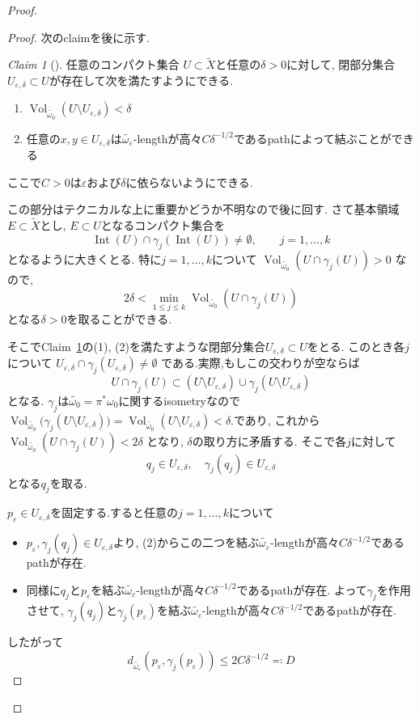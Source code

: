 \documentclass[dvipdfmx,a4paper,11pt]{article} %
\theoremstyle{definition}
\theoremstyle{remark}
\newtheorem{claim}[thm]{Claim}
\numberwithin{equation}{section}
\DeclareMathOperator{\Vol}{Vol}
\begin{document}
\begin{proof}
\begin{proof}
次のclaimを後に示す.  
\begin{claim}[{\cite[Lemma 1.3]{DPS96}}]
\label{claim-DPS-lem1.3}
任意のコンパクト集合 $U\subset\widetilde X$と任意の$\delta>0$に対して, 閉部分集合$U_{\varepsilon,\delta}\subset U$が存在して次を満たすようにできる. 
\begin{enumerate}
\item $\Vol_{\widetilde{\omega_0}}(U\setminus U_{\varepsilon,\delta})<\delta$
\item 任意の$x,y\in U_{\varepsilon,\delta}$は$\widetilde{\omega_\varepsilon}$-lengthが高々$C\delta^{-1/2}$であるpathによって結ぶことができる
\end{enumerate}
ここで$C>0$は$\varepsilon$および$\delta$に依らないようにできる.
\end{claim}
この部分はテクニカルな上に重要かどうか不明なので後に回す. 
さて基本領域$E\subset\widetilde X$とし, $E \subset U$となるコンパクト集合を
\[
\operatorname{Int}(U)\cap\gamma_j(\operatorname{Int}(U))\neq\emptyset,\qquad j=1,\ldots,k
\]
となるように大きくとる. 特に$j=1,\ldots,k$について
\(
\Vol_{\widetilde{\omega_0}}(U\cap\gamma_j(U))>0
\)
なので, 
\[
2\delta<\min_{1\leq j\leq k}\Vol_{\widetilde{\omega_0}}(U\cap\gamma_j(U))
\]
となる$\delta>0$を取ることができる. 

そこでClaim~\ref{claim-DPS-lem1.3}の(1), (2)を満たすような閉部分集合$U_{\varepsilon,\delta}\subset U$をとる. 
このとき各$j$について
\(
U_{\varepsilon,\delta}\cap\gamma_j(U_{\varepsilon,\delta})\neq\emptyset
\)
である.実際,もしこの交わりが空ならば
\[
U\cap\gamma_j(U)\subset
(U\setminus U_{\varepsilon,\delta})
\cup
\gamma_j(U\setminus U_{\varepsilon,\delta})
\]
となる. $\gamma_j$は$\widetilde{\omega_0}=\pi^*\omega_0$に関するisometryなので
\(
\Vol_{\widetilde{\omega_0}}
\bigl(\gamma_j(U\setminus U_{\varepsilon,\delta})\bigr)
=
\Vol_{\widetilde{\omega_0}}
(U\setminus U_{\varepsilon,\delta})
<\delta.
\)であり, これから
\(
\Vol_{\widetilde{\omega_0}}(U\cap\gamma_j(U))<2\delta
\)
となり, $\delta$の取り方に矛盾する.
そこで各$j$に対して
\[
q_j\in U_{\varepsilon,\delta},\quad
\gamma_j(q_j)\in U_{\varepsilon,\delta}
\]
となる$q_j$を取る.

$p_\varepsilon\in U_{\varepsilon,\delta}$を固定する.すると任意の$j=1,\ldots, k$について
\begin{itemize}
\item $p_\varepsilon,\gamma_j(q_j)\in U_{\varepsilon,\delta}$より,  (2)からこの二つを結ぶ$\widetilde{\omega_\varepsilon}$-lengthが高々$C\delta^{-1/2}$であるpathが存在.
\item 同様に$q_j$と$p_\varepsilon$を結ぶ$\widetilde{\omega_\varepsilon}$-lengthが高々$C\delta^{-1/2}$であるpathが存在. よって$\gamma_j$を作用させて, $\gamma_j(q_j)$と$\gamma_j(p_\varepsilon)$を結ぶ$\widetilde{\omega_\varepsilon}$-lengthが高々$C\delta^{-1/2}$であるpathが存在. 
\end{itemize}
したがって
\[
d_{\widetilde{\omega_\varepsilon}}(p_\varepsilon,\gamma_j(p_\varepsilon))
\leq 2C\delta^{-1/2}\eqqcolon D
\]
 \end{proof}



\end{proof}
\end{document}
